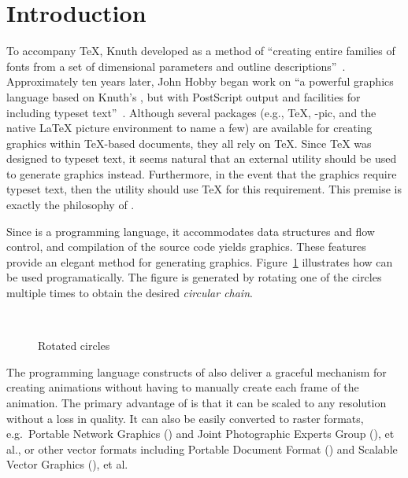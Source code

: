 \section{Introduction}
\label{sec:introduction}

\addtocounter{footnote}{1}To accompany \TeX{}, Knuth developed \MF{} as a method of ``creating entire families of fonts from a set of dimensional parameters and outline descriptions''~\cite{beebe:mf}.  Approximately ten years later, John Hobby began work on \MP{}\Dash ``a powerful graphics language based on Knuth's \MF, but with PostScript output and facilities for including typeset text''~\cite{hobby:user}.  Although several packages (e.g., \PiC\TeX, \Xy-pic, and the native \LaTeX{} picture environment to name a few) are available for creating graphics within \TeX-based documents, they all rely on \TeX{}.  Since \TeX{} was designed to typeset text, it seems natural that an external utility should be used to generate graphics instead.  Furthermore, in the event that the graphics require typeset text, then the utility should use \TeX{} for this requirement.  This premise is exactly the philosophy of \MP.

Since \MP{} is a programming language, it accommodates data structures and flow control, and compilation of the \MP{} source code yields \EPS{} graphics.  These features provide an elegant method for generating graphics.  Figure~\ref{fig:circles} illustrates how \MP{} can be used programatically.  The figure is generated by rotating one of the circles multiple times to obtain the desired \textit{circular chain}. 
\begin{figure}[hptb]
   \begin{center}\,\end{center}
	\caption{Rotated circles}\label{fig:circles}
\end{figure} 
The programming language constructs of \MP{} also deliver a graceful mechanism for creating animations without having to manually create each frame of the animation.  The primary advantage of \EPS{} is that it can be scaled to any resolution without a loss in quality.  It can also be easily converted to raster formats, e.g.\ Portable Network Graphics (\PNG) and Joint Photographic Experts Group (\JPEG), et al., or other vector formats including Portable Document Format (\PDF) and Scalable Vector Graphics (\SVG), et al.

